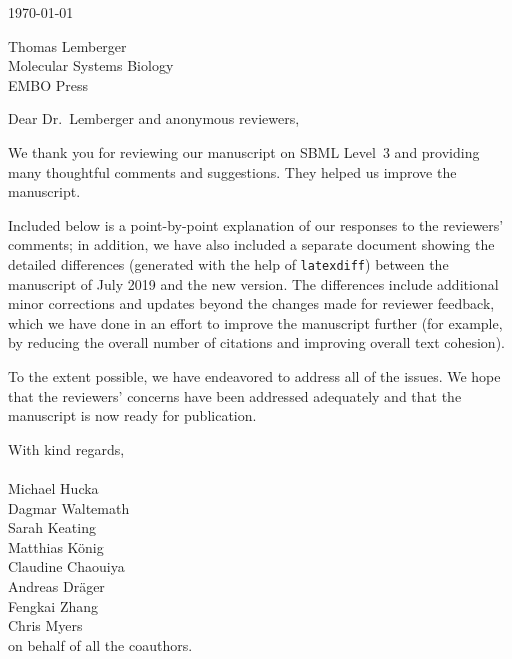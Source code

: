 \documentclass[11pt]{mhletter}
\begin{document}
\thispagestyle{empty}


\vspace*{4em}

\hspace{4.1in}\today

\vspace*{1em}

\begin{flushleft}
Thomas Lemberger\\
Molecular Systems Biology\\
EMBO Press
\end{flushleft}

\vspace*{1em}

\setlength{\parskip}{0.7em}

Dear Dr.\ Lemberger and anonymous reviewers,

We thank you for reviewing our manuscript on SBML Level~3 and providing many thoughtful comments and suggestions.  They helped us improve the manuscript.  

Included below is a point-by-point explanation of our responses to the reviewers' comments; in addition, we have also included a separate document showing the detailed differences (generated with the help of \texttt{latexdiff}) between the manuscript of July 2019 and the new version.  The differences include additional minor corrections and updates beyond the changes made for reviewer feedback, which we have done in an effort to improve the manuscript further (for example, by reducing the overall number of citations and improving overall text cohesion).

To the extent possible, we have endeavored to address all of the issues.  We hope that the reviewers' concerns have been addressed adequately and that the manuscript is now ready for publication.


\vspace*{1em}
\hspace{4in}
\begin{minipage}{3in}
With kind regards,\\
\\[1ex]
Michael Hucka\\
Dagmar Waltemath\\
Sarah Keating\\
Matthias K\"{o}nig\\
Claudine Chaouiya\\
Andreas Dr\"{a}ger\\
Fengkai Zhang\\
Chris Myers\\
on behalf of all the coauthors.
\end{minipage}
\end{document}
